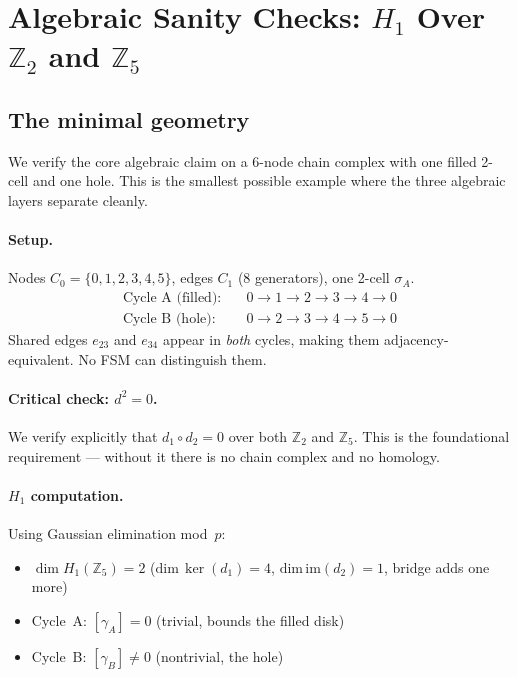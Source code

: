 \documentclass[11pt,a4paper]{article}
\begin{document}
\section{Algebraic Sanity Checks: $H_1$ Over $\mathbb{Z}_2$ and $\mathbb{Z}_5$}
\label{sec:algebraic}

\subsection{The minimal geometry}

We verify the core algebraic claim on a 6-node chain complex
with one filled 2-cell and one hole.
This is the smallest possible example where the three algebraic
layers separate cleanly.

\paragraph{Setup.}
Nodes $C_0=\{0,1,2,3,4,5\}$, edges $C_1$ (8 generators), one 2-cell $\sigma_A$.
\begin{align*}
\text{Cycle A (filled):}\quad &0\to1\to2\to3\to4\to0 \\
\text{Cycle B (hole):}\quad   &0\to2\to3\to4\to5\to0
\end{align*}
Shared edges $e_{23}$ and $e_{34}$ appear in \emph{both} cycles,
making them adjacency-equivalent.
No FSM can distinguish them.

\paragraph{Critical check: $d^2=0$.}
We verify explicitly that $d_1 \circ d_2 = 0$ over both $\mathbb{Z}_2$
and $\mathbb{Z}_5$.
This is the foundational requirement --- without it there is no chain
complex and no homology.

\paragraph{$H_1$ computation.}
Using Gaussian elimination mod~$p$:
\begin{itemize}
  \item $\dim H_1(\mathbb{Z}_5) = 2$
        ($\text{dim}\,\ker(d_1)=4$, $\text{dim}\,\mathrm{im}(d_2)=1$, bridge adds one more)
  \item Cycle~A: $[\gamma_A] = 0$ (trivial, bounds the filled disk)
  \item Cycle~B: $[\gamma_B] \neq 0$ (nontrivial, the hole)
\end{itemize}
\end{document}
